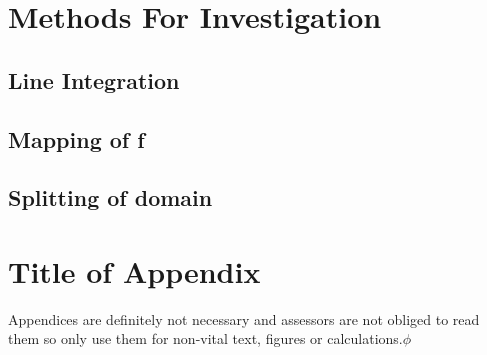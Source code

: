 \documentclass[12pt,a4paper]{article}
\begin{document}
\section{Methods For Investigation}

\subsection{Line Integration}


\subsection{Mapping of f}


\subsection{Splitting of domain}

\printbibliography[heading=bibintoc]

\appendix

\section{Title of Appendix}

Appendices are definitely not necessary and assessors are not obliged to read them so only use them for non-vital text, figures or calculations.$\phi$
\end{document}
